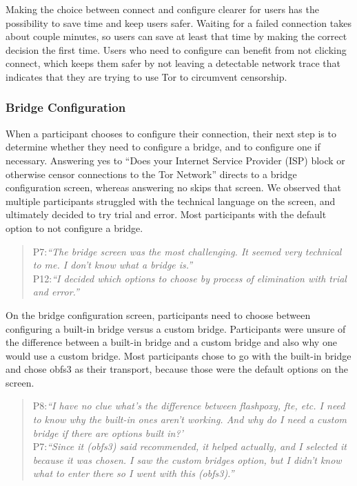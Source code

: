 \documentclass[USenglish,oneside,twocolumn]{article}
\begin{document}
Making the choice between connect and configure clearer for users has the possibility to save time and keep users safer. Waiting for a failed connection takes about couple minutes, so users can save at least that time by making the correct decision the first time. Users who need to configure can benefit from not clicking connect, which keeps them safer by not leaving a detectable network trace that indicates that they are trying to use Tor to circumvent censorship.\\

\subsubsection{Bridge Configuration} 
When a participant chooses to configure their connection, their next step is to determine whether they need to configure a bridge, and to configure one if necessary. Answering yes to ``Does your Internet Service Provider (ISP) block or otherwise censor connections to the Tor Network'' directs to a bridge configuration screen, whereas answering no skips that screen. We observed that multiple participants struggled with the technical language on the screen, and ultimately decided to try trial and error. Most participants with the default option to not configure a bridge. 

\begin{quotation}
\noindent P7:\textit{``The bridge screen was the most challenging. It seemed very technical to me. I don't know what a bridge is.''}\\

\noindent P12:\textit{``I decided which options to choose by process of elimination with trial and error.''}
\end{quotation} 

On the bridge configuration screen, participants need to choose between configuring a built-in bridge versus a custom bridge. Participants were unsure of the difference between a built-in bridge and a custom bridge and also why one would use a custom bridge. Most participants chose to go with the built-in bridge and chose obfs3 as their transport, because those were the default options on the screen. 

\begin{quotation} 
\noindent P8:\textit{``I have no clue what's the difference between flashpoxy, fte, etc. I need to know why the built-in ones aren't working. And why do I need a custom bridge if there are options built in?'}\\

\noindent P7:\textit{``Since it (obfs3) said recommended, it helped actually, and I selected it because it was chosen. I saw the custom bridges option, but I didn't know what to enter there so I went with this (obfs3).''}
\end{quotation} 
\end{document}
